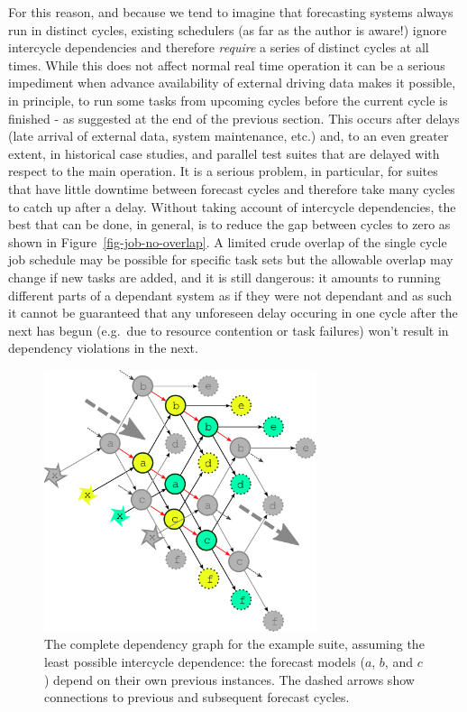 \documentclass[11pt,a4paper]{article}
\begin{document}
For this reason, and because we tend to imagine that forecasting systems
always run in distinct cycles, existing schedulers (as far as the author
is aware!) ignore intercycle dependencies and therefore {\em require} a
series of distinct cycles at all times. While this does not affect
normal real time operation it can be a serious impediment when advance
availability of external driving data makes it possible, in principle,
to run some tasks from upcoming cycles before the current cycle is
finished - as suggested at the end of the previous section. This occurs
after delays (late arrival of external data, system maintenance, etc.)
and, to an even greater extent, in historical case studies, and parallel
test suites that are delayed with respect to the main operation. It is
a serious problem, in particular, for suites that have little downtime
between forecast cycles and therefore take many cycles to catch up
after a delay. Without taking account of intercycle dependencies, the
best that can be done, in general, is to reduce the gap between cycles
to zero as shown in Figure~\ref{fig-job-no-overlap}. A limited crude
overlap of the single cycle job schedule may be possible for specific
task sets but the allowable overlap may change if new tasks are added,
and it is still dangerous: it amounts to running different parts of a
dependant system as if they were not dependant and as such it cannot be
guaranteed that any unforeseen delay occuring in one cycle after the 
next has begun (e.g.\ due to resource contention or task failures) won't
result in dependency violations in the next.

\begin{figure}
    \begin{center}
        \includegraphics[width=8cm]{inkscape-svg/dep-multi-cycle} 
    \end{center}
    \caption[Complete multicycle dependency graph]{\small The complete
    dependency graph for the example suite, assuming the least possible
    intercycle dependence: the forecast models ($a$, $b$, and $c$)
    depend on their own previous instances. The dashed arrows show
    connections to previous and subsequent forecast cycles.} 
    \label{fig-dep-multi}
\end{figure}
\end{document}
